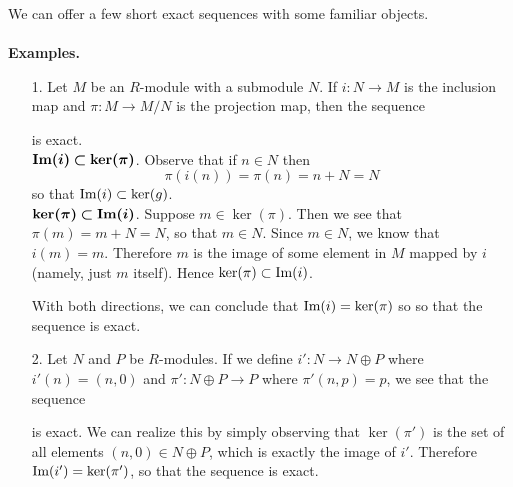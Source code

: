 We can offer a few short exact sequences with some familiar
objects. 
\\
\\
\textbf{Examples.}
\begin{itemize}
    \item[1.] Let $M$ be an $R$-module with a submodule $N$. If
    $i:N \to M$ is the inclusion map and 
    $\pi: M \to M/N$ is the projection map, then the sequence 
\begin{center}
\end{center}
is exact. \\
$\bm{\mbox{Im}(i) \subset \ker(\pi)}$. Observe
    that if $n \in N$ then 
    \[ 
        \pi(i(n)) = \pi(n) = n + N = N
    \]
    so that $\mbox{Im}(i) \subset \ker(g)$.
\\
$\bm{\ker(\pi) \subset \mbox{Im}(i)}$. Suppose $m
    \in \ker(\pi)$. Then we see that $\pi(m) = m + N = N$, so that
    $m \in N$. Since $m \in N$, we know that $i(m) = m$. Therefore
    $m$ is the image of some element in $M$ mapped by $i$ (namely,
    just $m$ itself). Hence $\ker(\pi) \subset \mbox{Im}(i)$.

With both directions, we can conclude that $\mbox{Im}(i) = \ker(\pi)$ so
so that the sequence is exact.

    \item[2.] Let $N$ and $P$ be $R$-modules. If we define $i':N
    \to N \oplus P$ where $i'(n) = (n, 0)$ and $\pi': N \oplus P
    \to P$ where $\pi'(n, p) = p$, we see that the sequence
    \begin{center} 
    \end{center}
    is exact. We can realize this by simply observing that
    $\ker(\pi')$ is the set of all elements $(n, 0) \in N \oplus
    P$, which is exactly the image of $i'$. Therefore $\mbox{Im}(i') =
    \ker(\pi')$, so that the sequence is exact.


\end{itemize}

